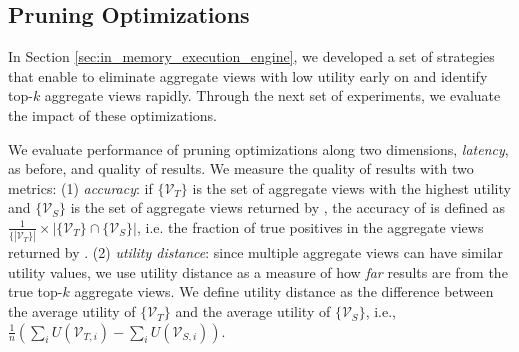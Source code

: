 
\subsection{Pruning Optimizations}
\label{sec:custom_execution_engine_expts}
In Section \ref{sec:in_memory_execution_engine}, we developed a set of strategies that enable \SeeDB to eliminate aggregate views with low utility early on and identify top-$k$ aggregate views rapidly.
Through the next set of experiments, we evaluate 
the impact of these optimizations.

We evaluate performance of pruning optimizations along two dimensions, {\em latency}, as before, and
quality of results.
We measure the quality of results with two metrics: 
(1) {\em accuracy}: if $\{\mathcal{V}_T\}$
is the set of aggregate views with the highest utility and $\{\mathcal{V}_S\}$ is the set of 
aggregate views returned by
\SeeDB, the accuracy of \SeeDB is defined as $\frac{1}{\{|\mathcal{V}_T\}|} \times 
|\{\mathcal{V}_T\} \cap \{\mathcal{V}_S\}|$, i.e. the
fraction of true positives in the aggregate views returned by \SeeDB. 
(2) {\em utility distance}: since multiple
aggregate views can have similar utility values, we use utility distance as a measure of how {\it far} \SeeDB 
results are from the true top-$k$ aggregate views. 
We define utility distance as the difference between the average utility of $\{\mathcal{V}_T\}$ 
and the average utility of $\{\mathcal{V}_S\}$, i.e., $\frac{1}{n}(\sum_{i}U(\mathcal{V}_{T,i}) - 
\sum_{i}U(\mathcal{V}_{S,i}))$.

